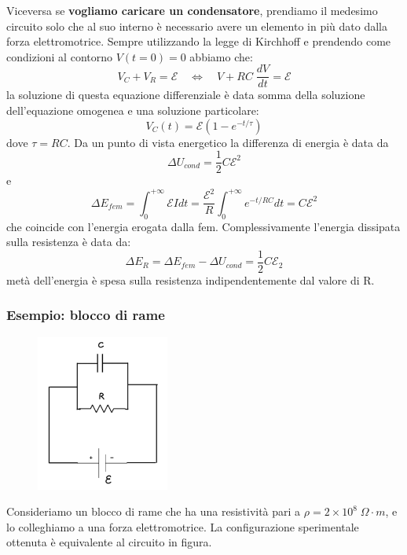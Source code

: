 Viceversa se \textbf{vogliamo caricare un condensatore}, prendiamo il medesimo circuito solo che al suo interno \`e necessario avere un elemento in pi\`u dato dalla forza elettromotrice. Sempre utilizzando la legge di Kirchhoff e prendendo come condizioni al contorno $V(t=0) = 0$ abbiamo che: 
\begin{equation*}
	V_{C} + V_{R} = \mathcal{E} \quad \iff \quad V + RC\; \frac{dV}{dt} = \mathcal{E} 
\end{equation*}
la soluzione di questa equazione differenziale \`e data somma della soluzione dell'equazione omogenea e una soluzione particolare:
\begin{equation*}
	V_{C}(t) = \mathcal{E} (1-e^{-t/\tau})
\end{equation*}
dove $\tau = RC$. Da un punto di vista energetico la differenza di energia \`e data da 
\begin{equation*}
	\Delta U_{cond} = \frac{1}{2}C \mathcal{E}^2
\end{equation*}
e 
\begin{equation*}
	\Delta E_{fem} = \int_{0}^{+\infty} \mathcal{E}I dt  =\frac{\mathcal{E}^2}{R} \int_{0}^{+\infty} e ^{-t/RC} dt = C \mathcal{E}^2
\end{equation*}
che coincide con l'energia erogata dalla fem. Complessivamente l'energia dissipata sulla resistenza \`e data da:
\begin{equation*}
	\Delta E_{R} = \Delta E_{fem} - \Delta U_{cond} = \frac{1}{2}C \mathcal{E}_{2}
\end{equation*}
met\`a dell'energia \`e spesa sulla resistenza indipendentemente dal valore di R.

\subsubsection{Esempio: blocco di rame}

\begin{figure}
\vspace{-1cm}
  \centering
  \includegraphics[width=0.39\textwidth]{images/rame}
\end{figure}
Consideriamo un blocco di rame che ha una resistivit\`a pari a $\rho  = 2 \times 10^8 \; \Omega \cdot m$, e lo colleghiamo a una forza elettromotrice. La configurazione sperimentale ottenuta \`e equivalente al circuito in figura.

